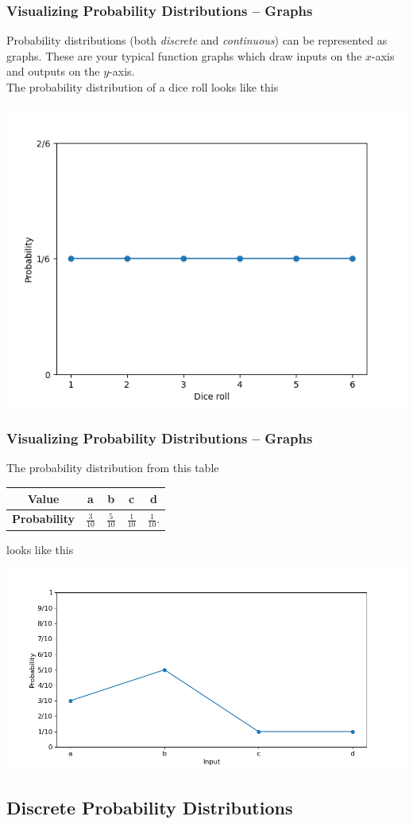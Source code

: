 \documentclass[aspectratio=169,11pt,usenames,dvipsnames,handout]{beamer}
\begin{document}
\begin{frame}
 \frametitle{Visualizing Probability Distributions -- Graphs}
 \alert{Probability distributions} (both \emph{discrete} and \emph{continuous})
 can be represented as graphs. These are your typical function graphs which draw
 inputs on the $x$-axis and outputs on the $y$-axis.\\ \pause
 The probability distribution of a dice roll looks like this
 \vspace*{-1em}
 \begin{center}
  \includegraphics[width=.45\linewidth]{dice-plot.png}
 \end{center}
\end{frame}

\begin{frame}
 \frametitle{Visualizing Probability Distributions -- Graphs}
 The probability distribution from this table
 \begin{center}
  \begin{tabular}{c|cccc}
   \textbf{Value} & a & b & c & d\\
   \midrule
   \textbf{Probability} & $\frac{3}{10}$ & $\frac{5}{10}$ & $\frac{1}{10}$ &
   $\frac{1}{10}$.
  \end{tabular}
 \end{center}
 looks like this
 \vspace*{-1em}
 \begin{center}
  \includegraphics[width=.55\linewidth]{random-probability.png}
 \end{center}
\end{frame}

\subsection{Discrete Probability Distributions}
\end{document}
